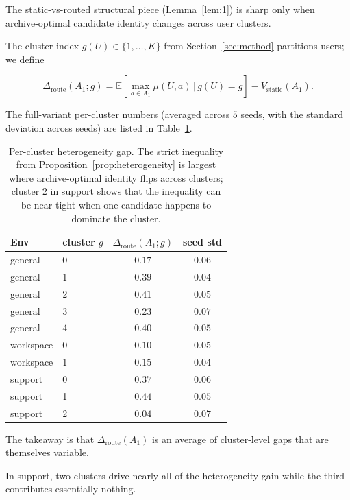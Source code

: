 \documentclass{article} %
\begin{document}
\label{app:per-cluster}

The static-vs-routed structural piece (Lemma~\ref{lem:1}) is sharp only when archive-optimal candidate identity changes across user clusters.

The cluster index $g(U)\in\{1,\dots,K\}$ from Section~\ref{sec:method} partitions users; we define

\begin{equation}
\label{eq:app-per-cluster-het}
\Delta_{\mathrm{route}}(A_1;g) = \mathbb{E}\!\left[\max_{a\in A_1}\mu(U,a)\,\bigg|\,g(U)=g\right] - V_{\mathrm{static}}(A_1).
\end{equation}

The full-variant per-cluster numbers (averaged across $5$ seeds, with the standard deviation across seeds) are listed in Table~\ref{tab:app-per-cluster}.

\begin{table}[h]
\centering
\small
\begin{tabular}{llcc}
\toprule
Env & cluster $g$ & $\Delta_{\mathrm{route}}(A_1;g)$ & seed std \\
\midrule
general    & 0 & $0.17$ & $0.06$ \\
general    & 1 & $0.39$ & $0.04$ \\
general    & 2 & $0.41$ & $0.05$ \\
general    & 3 & $0.23$ & $0.07$ \\
general    & 4 & $0.40$ & $0.05$ \\
\midrule
workspace  & 0 & $0.10$ & $0.05$ \\
workspace  & 1 & $0.15$ & $0.04$ \\
\midrule
support    & 0 & $0.37$ & $0.06$ \\
support    & 1 & $0.44$ & $0.05$ \\
support    & 2 & $0.04$ & $0.07$ \\
\bottomrule
\end{tabular}
\caption{Per-cluster heterogeneity gap. The strict inequality from Proposition~\ref{prop:heterogeneity} is largest where archive-optimal identity flips across clusters; cluster $2$ in support shows that the inequality can be near-tight when one candidate happens to dominate the cluster.}
\label{tab:app-per-cluster}
\end{table}

The takeaway is that $\Delta_{\mathrm{route}}(A_1)$ is an average of cluster-level gaps that are themselves variable.

In support, two clusters drive nearly all of the heterogeneity gain while the third contributes essentially nothing.
\end{document}
